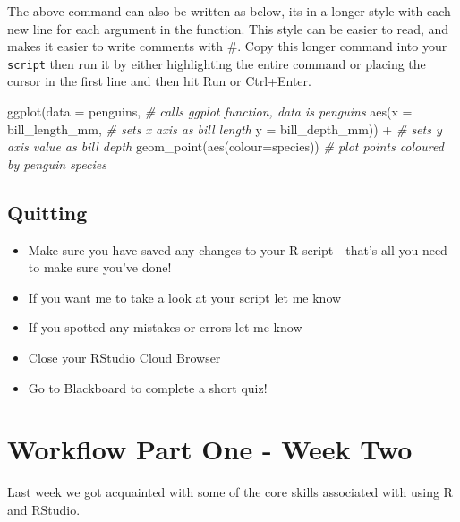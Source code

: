 \documentclass[
]{book}
\newenvironment{Shaded}{\begin{snugshade}}{\end{snugshade}}
\newcommand{\AttributeTok}[1]{\textcolor[rgb]{0.77,0.63,0.00}{#1}}
\newcommand{\CommentTok}[1]{\textcolor[rgb]{0.56,0.35,0.01}{\textit{#1}}}
\newcommand{\FunctionTok}[1]{\textcolor[rgb]{0.00,0.00,0.00}{#1}}
\newcommand{\NormalTok}[1]{#1}
\newcommand{\SpecialCharTok}[1]{\textcolor[rgb]{0.00,0.00,0.00}{#1}}
\begin{document}
The above command can also be written as below, its in a longer style with each new line for each argument in the function. This style can be easier to read, and makes it easier to write comments with \#. Copy this longer command into your \texttt{script} then run it by either highlighting the entire command or placing the cursor in the first line and then hit Run or Ctrl+Enter.

\begin{Shaded}
\begin{Highlighting}[]
\FunctionTok{ggplot}\NormalTok{(}\AttributeTok{data =}\NormalTok{ penguins, }\CommentTok{\# calls ggplot function, data is penguins}
       \FunctionTok{aes}\NormalTok{(}\AttributeTok{x =}\NormalTok{ bill\_length\_mm, }\CommentTok{\# sets x axis as bill length}
           \AttributeTok{y =}\NormalTok{ bill\_depth\_mm)) }\SpecialCharTok{+} \CommentTok{\# sets y axis value as bill depth}
    \FunctionTok{geom\_point}\NormalTok{(}\FunctionTok{aes}\NormalTok{(}\AttributeTok{colour=}\NormalTok{species)) }\CommentTok{\# plot points coloured by penguin species}
\end{Highlighting}
\end{Shaded}

\hypertarget{quitting}{%
\section{Quitting}\label{quitting}}

\begin{itemize}
\item
  Make sure you have saved any changes to your R script - that's all you need to make sure you've done!
\item
  If you want me to take a look at your script let me know
\item
  If you spotted any mistakes or errors let me know
\item
  Close your RStudio Cloud Browser
\item
  Go to Blackboard to complete a short quiz!
\end{itemize}

\hypertarget{workflow-part-one---week-two}{%
\chapter{Workflow Part One - Week Two}\label{workflow-part-one---week-two}}

Last week we got acquainted with some of the core skills associated with using R and RStudio.
\end{document}
